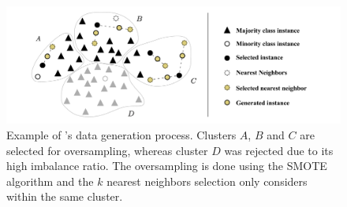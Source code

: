 \documentclass[remotesensing,article,submit,moreauthors,pdftex]{Definitions/mdpi}
\begin{document}
\begin{figure}[H]
	\centering
    \captionsetup{justification=centering}
    \caption{Example of 's data generation
        process. Clusters $A$, $B$ and $C$ are selected for oversampling,
        whereas cluster $D$ was rejected due to its high imbalance ratio. The
        oversampling is done using the SMOTE algorithm and the $k$ nearest
        neighbors selection only considers
        within the same cluster.
    \vspace{.2cm}}
	\label{fig:kmeans_smote_example}
	\includegraphics[width=1\linewidth]{../analysis/kmeans_smote_example}
\end{figure}
\end{document}
